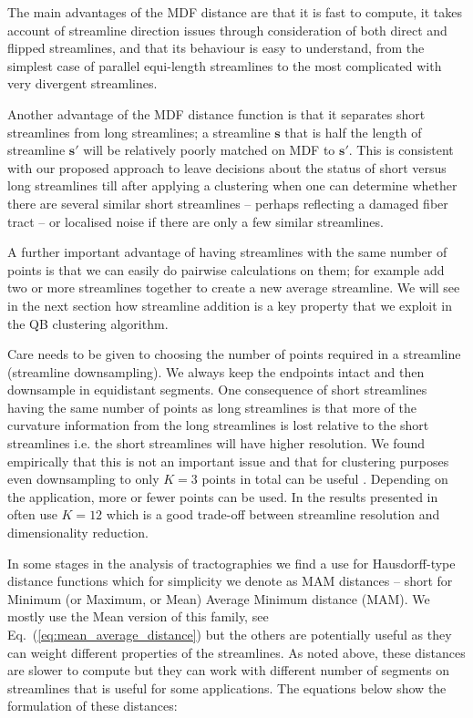\documentclass{bioinfo}
\begin{document}
\begin{methods}
The main advantages of the MDF distance are that it is fast to compute,
it takes account of streamline direction issues through consideration of
both direct and flipped streamlines, and that its behaviour is easy to
understand, from the simplest case of parallel equi-length streamlines
to the most complicated with very divergent streamlines. 

Another advantage of the MDF distance function is that it separates
short streamlines from long streamlines; a streamline $\mathbf{s}$ that
is half the length of streamline $\mathbf{s'}$ will be relatively poorly
matched on MDF to $\mathbf{s'}$. This is consistent with our proposed
approach to leave decisions about the status of short versus long
streamlines till after applying a clustering when one can determine
whether there are several similar short streamlines -- perhaps
reflecting a damaged fiber tract -- or localised noise if there are only
a few similar streamlines.

A further important advantage of having streamlines with the same number
of points is that we can easily do pairwise calculations on them; for
example add two or more streamlines together to create a new average
streamline. We will see in the next section how streamline addition is a
key property that we exploit in the QB clustering algorithm.

Care needs to be given to choosing the number of points required in a
streamline (streamline downsampling). We always keep the endpoints
intact and then downsample in equidistant segments. One consequence of
short streamlines having the same number of points as long streamlines
is that more of the curvature information from the long streamlines is
lost relative to the short streamlines i.e. the short streamlines will
have higher resolution.  We found empirically that this is not an
important issue and that for clustering purposes even downsampling to
only $K=3$ points in total can be useful \cite{EGMB10}. Depending on the
application, more or fewer points can be used. In the results presented
in often use $K=12$ which is a good trade-off between streamline
resolution and dimensionality reduction.

In some stages in the analysis of tractographies we find a use for
Hausdorff-type distance functions which for simplicity we denote as MAM
distances -- short for Minimum (or Maximum, or Mean) Average Minimum
distance (MAM). We mostly use the Mean version of this family, see
Eq.~(\ref{eq:mean_average_distance}) but the others are potentially
useful as they can weight different properties of the streamlines. As
noted above, these distances are slower to compute but they can work
with different number of segments on streamlines that is useful for some
applications. The equations below show the formulation of these
distances:


\end{methods}
\end{document}
